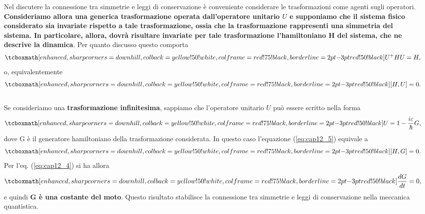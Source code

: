 \documentclass[a4paper,12pt,oneside]{book}
\begin{document}
Nel discutere la connessione tra simmetrie e leggi di conservazione è conveniente considerare le trasformazioni come agenti sugli operatori. \textbf{Consideriamo allora una generica trasformazione operata dall'operatore unitario ${U}$ e supponiamo che il sistema fisico considerato sia invariate rispetto a tale trasformazione, ossia che la trasformazione rappresenti una simmetria del sistema. In particolare, allora, dovrà risultare invariate per tale trasformazione l'hamiltoniano H del sistema, che ne descrive la dinamica}. Per quanto discusso questo comporta
	\begin{equation}
		\tcboxmath[enhanced, sharp corners=downhill, colback=yellow!50!white, colframe=red!75!black, borderline={2pt}{-3pt}{red!50!black}]{
			{U}^+H{U}= H,
			}
	\end{equation}
o, equivalentemente 
	\begin{equation}
	\label{eq:cap12_5}
		\tcboxmath[enhanced, sharp corners=downhill, colback=yellow!50!white, colframe=red!75!black, borderline={2pt}{-3pt}{red!50!black}]{
			[H,{U}]=0.
			}
	\end{equation}\\

Se consideriamo una \textbf{trasformazione infinitesima}, sappiamo che l'operatore unitario ${U}$ può essere scritto nella forma 
	\begin{equation}
		\tcboxmath[enhanced, sharp corners=downhill, colback=yellow!50!white, colframe=red!75!black, borderline={2pt}{-3pt}{red!50!black}]{
			{U}= 1- \frac{i\varepsilon}{\hbar}G,
			}
	\end{equation}
dove G è il generatore hamiltoniano della trasformazione considerata. In questo caso l'equazione (\ref{eq:cap12_5}) equivale a 
	\begin{equation} 
		\tcboxmath[enhanced, sharp corners=downhill, colback=yellow!50!white, colframe=red!75!black, borderline={2pt}{-3pt}{red!50!black}]{
			[H,G]=0.
			}
	\end{equation}
Per l'eq. (\ref{eq:cap12_4}) si ha allora
	\begin{equation}
		\tcboxmath[enhanced, sharp corners=downhill, colback=yellow!50!white, colframe=red!75!black, borderline={2pt}{-3pt}{red!50!black}]{
			\frac{dG}{dt}=0,
			}
	\end{equation}
e quindi \textbf{G è una costante del moto}. Questo risultato stabilisce la connessione tra simmetrie e leggi di conservazione nella meccanica quantistica.\\
\end{document}
